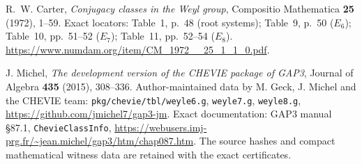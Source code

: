 R.~W. Carter, \emph{Conjugacy classes in the Weyl group}, Compositio
Mathematica \textbf{25} (1972), 1--59.
Exact locators: Table~1, p.~48 (root systems); Table~9, p.~50 (\(E_6\));
Table~10, pp.~51--52 (\(E_7\)); Table~11, pp.~52--54 (\(E_8\)).
\url{https://www.numdam.org/item/CM_1972__25_1_1_0.pdf}.

J. Michel, \emph{The development version of the CHEVIE package of GAP3},
Journal of Algebra \textbf{435} (2015), 308--336.
Author-maintained data by M. Geck, J. Michel and the CHEVIE team:
\texttt{pkg/chevie/tbl/weyle6.g}, \texttt{weyle7.g}, \texttt{weyle8.g},
\url{https://github.com/jmichel7/gap3-jm}.
Exact documentation: GAP3 manual \S87.1, \texttt{ChevieClassInfo},
\url{https://webusers.imj-prg.fr/~jean.michel/gap3/htm/chap087.htm}.
The source hashes and compact mathematical witness data are retained
with the exact certificates.
